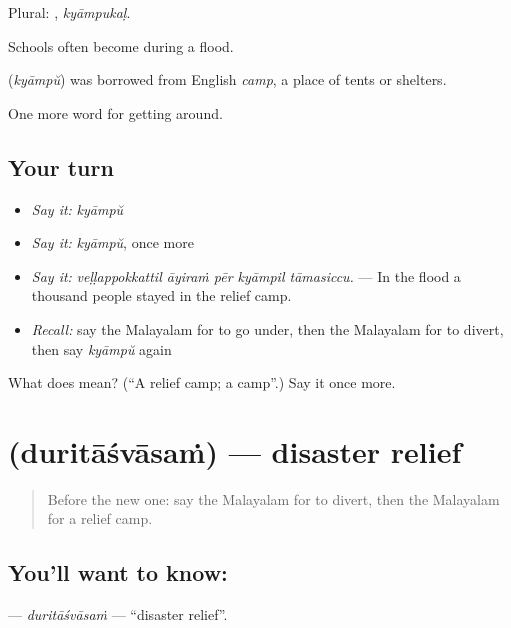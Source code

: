 Plural: , \emph{kyāmpukaḷ}.

Schools often become  during a flood.

\begin{cousinweb}
\textbf{} (\emph{kyāmpŭ}) was borrowed from English \emph{camp}, a place of tents or shelters.
\end{cousinweb}

\begin{grammarlens}[title={What you've built}]
One more word for getting around.
\end{grammarlens}

\subsection*{Your turn}
\begin{itemize}
\raggedright
  \item \emph{Say it:} \emph{kyāmpŭ}
  \item \emph{Say it:} \emph{kyāmpŭ}, once more
  \item \emph{Say it:} \emph{veḷḷappokkattil āyiraṁ pēr kyāmpil tāmasiccu.} — In the flood a thousand people stayed in the relief camp.
  \item \emph{Recall:} say the Malayalam for to go under, then the Malayalam for to divert, then say \emph{kyāmpŭ} again
\end{itemize}

\begin{tcolorbox}[breakable,colback=teal!4,colframe=teal!35!black,title={Before you move on}]
What does  mean? (\textquotedblleft{}A relief camp; a camp\textquotedblright{}.) Say it once more.
\end{tcolorbox}
\section[\texorpdfstring{\ml{ദുരിതാശ്വാസം} (duritāśvāsaṁ)}{ദുരിതാശ്വാസം (duritāśvāsaṁ)}]{ (duritāśvāsaṁ) — disaster relief}

\label{lesson:ML-C513-duritasvasam}



\begin{quote}
Before the new one: say the Malayalam for to divert, then the Malayalam for a relief camp.
\end{quote}

\subsection*{You'll want to know: }
\textbf{} — \emph{duritāśvāsaṁ} — \textquotedblleft{}disaster relief\textquotedblright{}.

